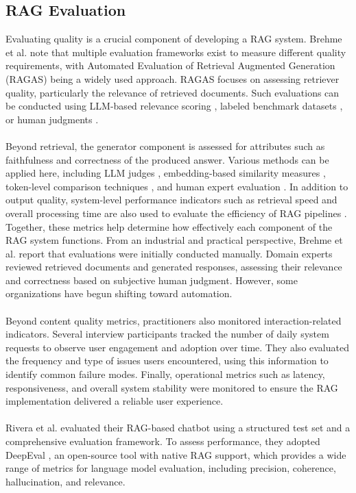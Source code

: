 \subsection{RAG Evaluation}
Evaluating quality is a crucial component of developing a RAG system. Brehme et al. \cite{Brehme} note that multiple evaluation frameworks exist to measure different quality requirements, with Automated Evaluation of Retrieval Augmented Generation (RAGAS) being a widely used approach. RAGAS focuses on assessing retriever quality, particularly the relevance of retrieved documents. Such evaluations can be conducted using LLM-based relevance scoring \cite{James}, labeled benchmark datasets \cite{Tang}, or human judgments \cite{Afzal}.
\\\\
Beyond retrieval, the generator component is assessed for attributes such as faithfulness and correctness of the produced answer. Various methods can be applied here, including LLM judges \cite{James}, embedding-based similarity measures \cite{Kukreja}, token-level comparison techniques \cite{Li}, and human expert evaluation \cite{Pipitone}. In addition to output quality, system-level performance indicators such as retrieval speed and overall processing time are also used to evaluate the efficiency of RAG pipelines \cite{Kukreja}. Together, these metrics help determine how effectively each component of the RAG system functions.
From an industrial and practical perspective, Brehme et al. report that evaluations were initially conducted manually. Domain experts reviewed retrieved documents and generated responses, assessing their relevance and correctness based on subjective human judgment. However, some organizations have begun shifting toward automation. 
\\\\
Beyond content quality metrics, practitioners also monitored interaction-related indicators. Several interview participants tracked the number of daily system requests to observe user engagement and adoption over time. They also evaluated the frequency and type of issues users encountered, using this information to identify common failure modes. Finally, operational metrics such as latency, responsiveness, and overall system stability were monitored to ensure the RAG implementation delivered a reliable user experience.
\\\\
Rivera et al. \cite{Rivera} evaluated their RAG-based chatbot using a structured test set and a comprehensive evaluation framework. To assess performance, they adopted DeepEval \cite{deepeval}, an open-source tool with native RAG support, which provides a wide range of metrics for language model evaluation, including precision, coherence, hallucination, and relevance.
